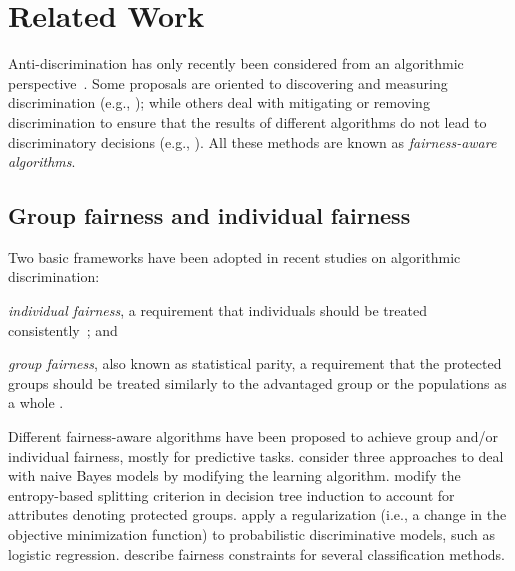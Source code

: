 \section{Related Work}\label{sec:related-work}
Anti-discrimination has only recently been considered from an algorithmic perspective~\cite{tuto2016}. Some proposals are oriented to discovering and measuring discrimination (e.g., \cite{peder2008,Bonchi2015,angwin_2016_machine}); while others deal with mitigating or removing discrimination to ensure that the results of different algorithms do not lead to discriminatory decisions
(e.g., \cite{CaldersICDM,HajianFerrer12,hajian2014,Dwork2012,Zemel2013}).
%
All these methods are known as \emph{fairness-aware algorithms}.

\subsection{Group fairness and individual fairness}
Two basic frameworks have been adopted in recent studies on algorithmic discrimination: \begin{inparaenum}[(i)]
	\item \emph{individual fairness}, a requirement that individuals should be treated consistently~\cite{Dwork2012, zliobaite2015survey}; and
	\item \emph{group fairness}, also known as statistical parity, a requirement that the protected groups should be treated similarly to the advantaged group or the populations as a whole \cite{peder2008,pederruggi2009}.
\end{inparaenum}

Different fairness-aware algorithms have been proposed to achieve group and/or individual fairness, mostly for predictive tasks. \citet{Calders2010} consider three approaches to deal with naive Bayes models by modifying the learning algorithm.
\citet{CaldersICDM} modify the entropy-based splitting criterion in decision tree induction to account for attributes denoting protected groups.
\citet{Kamishima2012}  apply a regularization (i.e., a
change in the objective minimization function) to probabilistic discriminative models, such
as logistic regression. \citet{zafar2015} describe fairness constraints for several classification methods.

